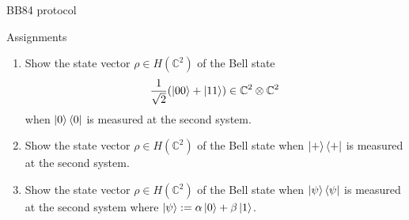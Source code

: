 \documentclass[10pt]{beamer}
\begin{document}
\begin{frame}{BB84 protocol}
\end{frame}
\fi

\begin{frame}{Assignments}
\begin{enumerate}
\setlength{\itemsep}{2em}
\item Show the state vector $\rho\in H(\mathbb{C}^2)$ of the Bell state
\begin{equation*}
\frac1{\sqrt{2}}(\ket{00}+\ket{11}) \in \mathbb{C}^2\otimes \mathbb{C}^2
\end{equation*}
when $\ket{0}\bra{0}$ is measured at the second system.
\item Show the state vector $\rho\in H(\mathbb{C}^2)$ of the Bell state
when $\ket{+}\bra{+}$ is measured at the second system.
\item Show the state vector $\rho\in H(\mathbb{C}^2)$ of the Bell state
when $\ket{\psi}\bra{\psi}$ is measured at the second system where $\ket{\psi}:=\alpha\ket{0}+\beta\ket{1}$.
\end{enumerate}
\end{frame}
\end{document}
